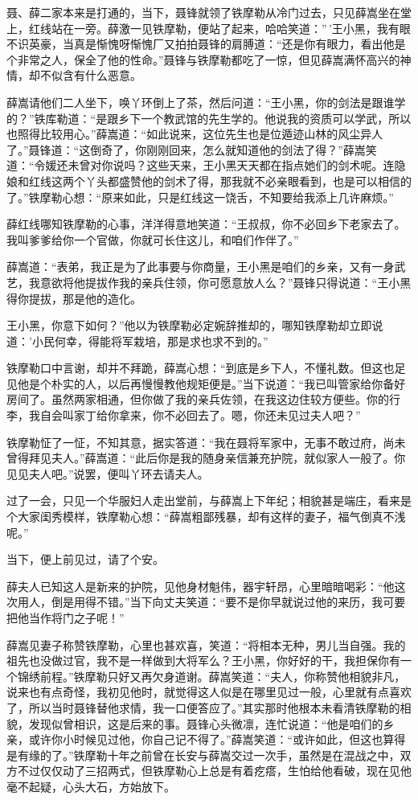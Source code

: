 \documentclass[12pt,oneside]{book}
\begin{document}
聂、薛二家本来是打通的，当下，聂锋就领了铁摩勒从冷门过去，只见薛嵩坐在堂上，红线站在一旁。薛激一见铁摩勒，便站了起来，哈哈笑道：''\,'王小黑，我有眼不识英豪，当真是惭愧呀惭愧厂又拍拍聂锋的肩膊道：``还是你有眼力，看出他是个非常之人，保全了他的性命。''聂锋与铁摩勒都吃了一惊，但见薛嵩满怀高兴的神情，却不似含有什么恶意。

薛嵩请他们二人坐下，唤丫环倒上了茶，然后问道：``王小黑，你的剑法是跟谁学的？''铁库勒道：``是跟乡下一个教武馆的先生学的。他说我的资质可以学武，所以也照得比较用心。''薛嵩道：``如此说来，这位先生也是位遁迹山林的风尘异人了。''聂锋道：``这倒奇了，你刚刚回来，怎么就知道他的剑法了得？''薛嵩笑道：``令媛还未曾对你说吗？这些天来，王小黑天天都在指点她们的剑术呢。连隐娘和红线这两个丫头都盛赞他的剑术了得，那我就不必亲眼看到，也是可以相信的了。''铁摩勒心想：``原来如此，只是红线这一饶舌，不知要给我添上几许麻烦。''

薛红线哪知铁摩勒的心事，洋洋得意地笑道：``王叔叔，你不必回乡下老家去了。我叫爹爹给你一个官做，你就可长住这儿，和咱们作伴了。''

薛嵩道：``表弟，我正是为了此事要与你商量，王小黑是咱们的乡亲，又有一身武艺，我意欲将他提拔作我的亲兵住领，你可愿意放人么？''聂锋只得说道：``王小黑得你提拔，那是他的造化。

王小黑，你意下如何？''他以为铁摩勒必定婉辞推却的，哪知铁摩勒却立即说道：'小民何幸，得能将军栽培，那是求也求不到的。''

铁摩勒口中言谢，却并不拜跪，薛嵩心想：``到底是乡下人，不懂礼数。但这也足见他是个朴实的人，以后再慢慢教他规矩便是。''当下说道：``我已叫管家给你备好房间了。虽然两家相通，但你做了我的亲兵佐领，在我这边住较方便些。你的行李，我自会叫家丁给你拿来，你不必回去了。嗯，你还未见过夫人吧？''

铁摩勒怔了一怔，不知其意，据实答道：``我在聂将军家中，无事不敢过府，尚未曾得拜见夫人。''薛嵩道：``此后你是我的随身亲信兼充护院，就似家人一般了。你见见夫人吧。''说罢，便叫丫环去请夫人。

过了一会，只见一个华服妇人走出堂前，与薛嵩上下年纪；相貌甚是端庄，看来是个大家闺秀模样，铁摩勒心想：``薛嵩粗鄙残暴，却有这样的妻子，福气倒真不浅呢。''

当下，便上前见过，请了个安。

薛夫人已知这人是新来的护院，见他身材魁伟，器宇轩昂，心里暗暗喝彩：``他这次用人，倒是用得不错。''当下向丈夫笑道：``要不是你早就说过他的来历，我可要把他当作将门之子呢！''

薛嵩见妻子称赞铁摩勒，心里也甚欢喜，笑道：``将相本无种，男儿当自强。我的祖先也没做过官，我不是一样做到大将军么？王小黑，你好好的干，我担保你有一个锦绣前程。''铁摩勒只好又再欠身道谢。薛嵩笑道：``夫人，你称赞他相貌非凡，说来也有点奇怪，我初见他时，就觉得这人似是在哪里见过一般，心里就有点喜欢了，所以当时聂锋替他求情，我一口便答应了。''其实那时他根本未看清铁摩勒的相貌，发现似曾相识，这是后来的事。聂锋心头微凛，连忙说道：``他是咱们的乡亲，或许你小时候见过他，你自己记不得了。''薛嵩笑道：``或许如此，但这也算得是有缘的了。''铁摩勒十年之前曾在长安与薛嵩交过一次手，虽然是在混战之中，双方不过仅仅动了三招两式，但铁摩勒心上总是有着疙瘩，生怕给他看破，现在见他毫不起疑，心头大石，方始放下。
\end{document}
